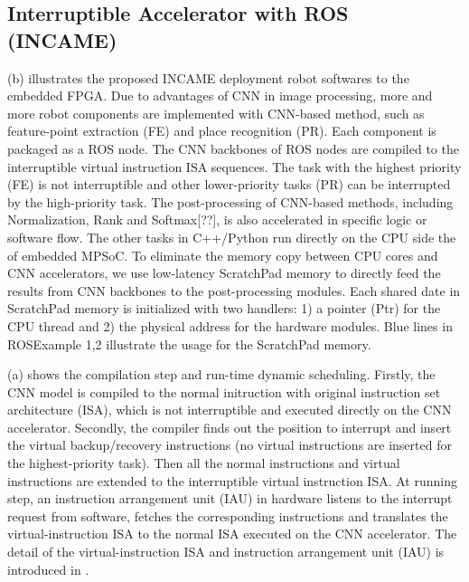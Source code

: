 \subsection{ Interruptible Accelerator with ROS (INCAME) }


(b) illustrates the proposed INCAME deployment robot softwares to the embedded FPGA.
Due to advantages of CNN in image processing, more and more robot components are implemented with CNN-based method, such as feature-point extraction (FE) and place recognition (PR).
Each component is packaged as a ROS node.
The CNN backbones of ROS nodes are compiled to the  interruptible virtual instruction ISA sequences.
The task with the highest priority (FE) is not interruptible and other lower-priority tasks (PR) can be interrupted by the high-priority task. 
The post-processing of CNN-based methods, including Normalization, Rank and Softmax[??], is also accelerated in specific logic or software flow. The other tasks in C++/Python run directly on the CPU side the of embedded MPSoC\cite{MPSoC}. To eliminate the memory copy between CPU cores and CNN accelerators, we use low-latency ScratchPad memory \cite{Banakar2002Scratchpad} to directly feed the results from CNN backbones to the post-processing modules. Each shared date in ScratchPad memory is initialized with two handlers: 1) a pointer (Ptr) for the CPU thread and 2) the physical address for the hardware modules. Blue lines in  ROSExample 1,2 illustrate the usage for the ScratchPad memory.

(a) shows the compilation step and run-time dynamic scheduling. Firstly, the CNN model is compiled to the normal initruction with original instruction set architecture (ISA), which is not interruptible and executed directly on the CNN accelerator.
Secondly, the compiler finds out the position to interrupt and insert the virtual backup/recovery instructions (no virtual instructions are inserted for the highest-priority task). 
Then all the normal instructions and virtual instructions are extended to the interruptible virtual instruction ISA. At running step, an instruction arrangement unit (IAU) in hardware listens to the interrupt request from software, fetches the corresponding instructions and translates the virtual-instruction ISA to the normal ISA executed on the CNN accelerator. 
The detail of the virtual-instruction ISA and instruction arrangement unit (IAU) is introduced in .


